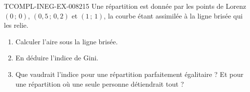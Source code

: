 \begin{exercice}{TCOMPL-INEG-EX-008}{2}{15}
Une répartition est donnée par les points de Lorenz $(0\,;\,0)$,
$(0{,}5\,;\,0{,}2)$ et $(1\,;\,1)$, la courbe étant assimilée à la ligne
brisée qui les relie.
\begin{enumerate}
  \item Calculer l'aire sous la ligne brisée.
  \item En déduire l'indice de Gini.
  \item Que vaudrait l'indice pour une répartition parfaitement égalitaire ?
        Et pour une répartition où une seule personne détiendrait tout ?
\end{enumerate}
\end{exercice}
